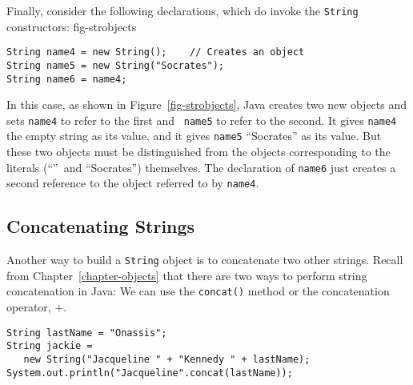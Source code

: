 Finally, consider the following declarations, which do invoke the
{\tt String} constructors:
{fig-strobjects}


\begin{jjjlisting}
\begin{lstlisting}
String name4 = new String();    // Creates an object
String name5 = new String("Socrates");
String name6 = name4;
\end{lstlisting}
\end{jjjlisting}

\noindent In this case, as shown in Figure~\ref{fig-strobjects},  Java creates 
two new objects and sets {\tt name4} to refer to the first and {\tt
name5} to refer to the second.  It gives {\tt name4} the empty string
as its value, and it gives {\tt name5} ``Socrates'' as its value.  But
these two objects must be distinguished from the objects corresponding
to the literals (``''~and ``Socrates'') themselves.  The
declaration of {\tt name6} just creates a second reference to the
object referred to by {\tt name4}.




\subsection{Concatenating Strings }
\noindent Another way to build a {\tt String} object is to concatenate
two other strings. Recall from Chapter~\ref{chapter-objects} that there are two ways to
perform string concatenation in Java: We can use the {\tt concat()}
method or the concatenation operator, $+$.

\begin{jjjlisting}
\begin{lstlisting}
String lastName = "Onassis";
String jackie = 
   new String("Jacqueline " + "Kennedy " + lastName);
System.out.println("Jacqueline".concat(lastName));
\end{lstlisting}
\end{jjjlisting}

